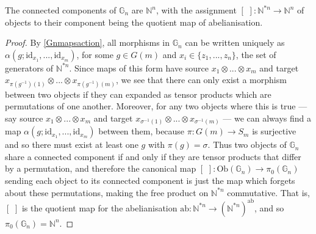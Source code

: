 \begin{prop}\label{Gnconcomp} The connected components of $\mathbb{G}_n$ are $\mathbb{N}^n$, with the assignment $[ \,\, ] : \mathbb{N}^{*n} \to \mathbb{N}^n$ of objects to their component being the quotient map of abelianisation.
\end{prop}
\begin{proof}
By \cref{Gnmapsaction}, all morphisms in $\mathbb{G}_n$ can be written uniquely as $\alpha(g; \mathrm{id}_{x_1}, ..., \mathrm{id}_{x_m})$, for some $g \in G(m)$ and $x_i \in \{z_1, ..., z_n \}$, the set of generators of $\mathbb{N}^{*n}$. Since maps of this form have source $x_1 \otimes ... \otimes x_m$ and target $x_{\pi(g^{-1})(1)} \otimes ... \otimes x_{\pi(g^{-1})(m)}$, we see that there can only exist a morphism between two objects if they can expanded as tensor products which are permutations of one another. Moreover, for any two objects where this is true --- say source $x_1 \otimes ... \otimes x_m$ and target $x_{\sigma^{-1}(1)} \otimes ... \otimes x_{\sigma^{-1}(m)}$ --- we can always find a map $\alpha(g; \mathrm{id}_{x_1}, ..., \mathrm{id}_{x_m})$ between them, because $\pi: G(m) \to S_m$ is surjective and so there must exist at least one $g$ with $\pi(g) = \sigma$. Thus two objects of $\mathbb{G}_n$ share a connected component if and only if they are tensor products that differ by a permutation, and therefore the canonical map $[ \,\, ] : \mathrm{Ob}(\mathbb{G}_n) \to \pi_0(\mathbb{G}_n)$ sending each object to its connected component is just the map which forgets about these permutations, making the free product on $\mathbb{N}^{*n}$ commutative. That is, $[ \,\, ]$ is the quotient map for the abelianisation $\mathrm{ab} : \mathbb{N}^{*n} \to (\mathbb{N}^{*n})^{\mathrm{ab}}$, and so $\pi_0(\mathbb{G}_n) = \mathbb{N}^n$.
\end{proof}